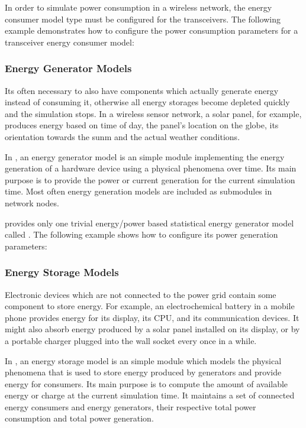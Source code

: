 In order to simulate power consumption in a wireless network, the energy consumer model type must be configured for the transceivers. The following example demonstrates how to configure the power consumption parameters for a transceiver energy consumer model:


\subsubsection*{Energy Generator Models}
Its often necessary to also have components which actually generate energy instead of consuming it, otherwise all energy storages become depleted quickly and the simulation stops. In a wireless sensor network, a solar panel, for example, produces energy based on time of day, the panel’s location on the globe, its orientation towards the sunm and the actual weather conditions.

In \inet, an energy generator model is an \omnet simple module implementing the energy generation of a hardware device using a physical phenomena over time. Its main purpose is to provide the power or current generation for the current simulation time. Most often energy generation models are included as submodules in network nodes.

\inet provides only one trivial energy/power based statistical energy generator model called . The following example shows how to configure its power generation parameters:


\subsubsection*{Energy Storage Models}
Electronic devices which are not connected to the power grid contain some component to store energy. For example, an electrochemical battery in a mobile phone provides energy for its display, its CPU, and its communication devices. It might also absorb energy produced by a solar panel installed on its display, or by a portable charger plugged into the wall socket every once in a while.

In \inet, an energy storage model is an \omnet simple module which models the physical phenomena that is used to store energy produced by generators and provide energy for consumers. Its main purpose is to compute the amount of available energy or charge at the current simulation time. It maintains a set of connected energy consumers and energy generators, their respective total power consumption and total power generation.


